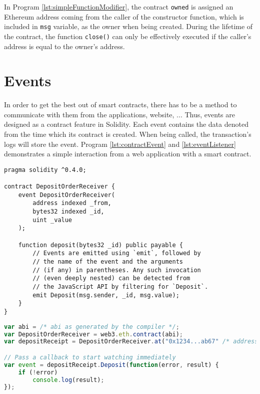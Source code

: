 In Program \ref{lst:simpleFunctionModifier}, the contract \texttt{owned} is assigned an Ethereum address coming from the caller of the constructor function, which is included in \texttt{msg} variable, as the owner when being created. During the lifetime of the contract, the function \texttt{close()} can only be effectively executed if the caller's address is equal to the owner's address.

\section{Events}

In order to get the best out of smart contracts, there has to be a method to communicate with them from the applications, website, ... Thus, events are designed as a contract feature in Solidity. Each event contains the data denoted from the time which its contract is created. When being called, the transaction's logs will store the event. Program \ref{lst:contractEvent} and \ref{lst:eventListener} demonstrates a simple interaction from a web application with a smart contract.

\begin{lstlisting}[float,caption={Contract with Event derived from \citep{SolidityDocumentation}.},label={lst:contractEvent},language=Solidity]
pragma solidity ^0.4.0;

contract DepositOrderReceiver {
    event DepositOrderReceiver(
        address indexed _from,
        bytes32 indexed _id,
        uint _value
    );

    function deposit(bytes32 _id) public payable {
        // Events are emitted using `emit`, followed by
        // the name of the event and the arguments
        // (if any) in parentheses. Any such invocation
        // (even deeply nested) can be detected from
        // the JavaScript API by filtering for `Deposit`.
        emit Deposit(msg.sender, _id, msg.value);
    }
}
\end{lstlisting}

\begin{lstlisting}[float,caption={Listening to Event from web applications \citep{SolidityDocumentation}.},label={lst:eventListener},language=JavaScript]
var abi = /* abi as generated by the compiler */;
var DepositOrderReceiver = web3.eth.contract(abi);
var depositReceipt = DepositOrderReceiver.at("0x1234...ab67" /* address */);

// Pass a callback to start watching immediately
var event = depositReceipt.Deposit(function(error, result) {
    if (!error)
        console.log(result);
});
\end{lstlisting}

